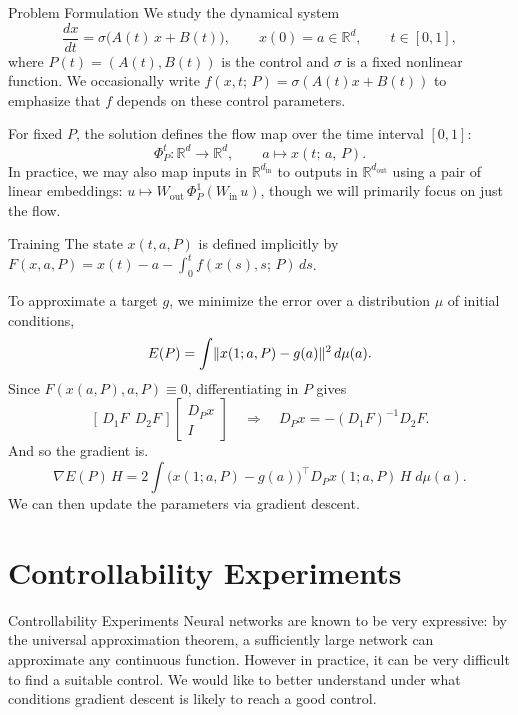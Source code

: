 \documentclass[aspectratio=169]{beamer}
\newcommand{\R}{\mathbb{R}}
\DeclarePairedDelimiter{\norm}{\lVert}{\rVert}
\begin{document}

\begin{frame}{Problem Formulation}
We study the dynamical system
\[
\frac{dx}{dt} = \sigma\bigl(A(t)\,x + B(t)\bigr), \qquad x(0) = a \in \R^d, \qquad t \in [0,1],
\]
where $P(t) = (A(t), B(t))$ is the control and $\sigma$ is a fixed nonlinear function.
\newline We occasionally write $f(x, t;\,P) = \sigma(A(t)x + B(t))$ to emphasize that $f$ depends on these control parameters.

\bigskip
For fixed $P$, the solution defines the flow map over the time interval $[0,1]$:
\[
\Phi^t_P: \R^d \to \R^d, \qquad a \mapsto x(t;\,a,\,P).
\]
In practice, we may also map inputs in $\R^{d_{\mathrm{in}}}$ to outputs in $\R^{d_{\mathrm{out}}}$ using a pair of linear embeddings: $u \mapsto W_{\mathrm{out}}\,\Phi^1_P(W_{\mathrm{in}}\,u)$, though we will primarily focus on just the flow.
\end{frame}


\begin{frame}{Training}
The state $x(t,a,P)$ is defined implicitly by $F(x,a,P) = x(t) - a - \int_0^t f(x(s),s;\,P)\,ds$.

To approximate a target $g$, we minimize the error over a distribution $\mu$ of initial conditions,
\[
E(P) = \int \norm{x(1;a,P) - g(a)}^2 \, d\mu(a).
\]
Since $F(x(a,P),a,P) \equiv 0$, differentiating in $P$ gives
\[
[\,D_1 F \ \ D_2 F\,]\begin{bmatrix} D_P x \\ I \end{bmatrix} \quad\Longrightarrow\quad
D_P x = -(D_1 F)^{-1} D_2 F.
\]
And so the gradient is.
\[
\nabla E(P)\,H = 2\int \bigl(x(1;a,P) - g(a)\bigr)^{\!\top} D_P x(1;a,P)\,H \; d\mu(a).
\]
We can then update the parameters via gradient descent.
\end{frame}


\section{Controllability Experiments}

\begin{frame}{Controllability Experiments}
Neural networks are known to be very expressive: by the universal approximation theorem, a sufficiently large network can approximate any continuous function. However in practice, it can be very difficult to find a suitable control. We would like to better understand under what conditions gradient descent is likely to reach a good control.
\end{frame}
\end{document}
